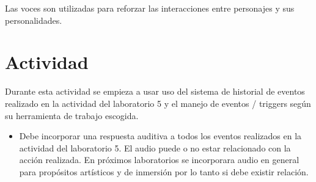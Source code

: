 Las voces son utilizadas para reforzar las interacciones entre personajes y sus personalidades.

\section{Actividad}
Durante esta actividad se empieza a usar uso del sistema de historial de eventos realizado en la actividad del laboratorio 5 y el manejo de eventos / triggers según su herramienta de trabajo escogida.
\begin{itemize}
\item Debe incorporar una respuesta auditiva a todos los eventos realizados en la actividad del laboratorio 5. El audio puede o no estar relacionado con la acción realizada. En próximos laboratorios se incorporara audio en general para propósitos artísticos y de inmersión por lo tanto si debe existir relación.
\end{itemize}